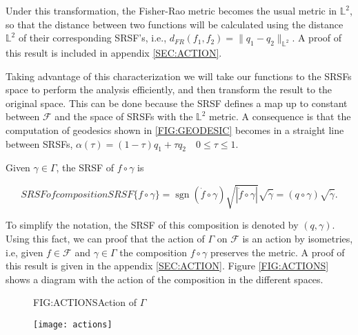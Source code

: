 Under this transformation, the Fisher-Rao metric becomes the usual metric
in $\mathbb{L}^2$, so that the distance between two functions will be
calculated using the distance $\mathbb{L}^2$ of their corresponding
SRSF's, i.e.,  $d_{FR}(f_1, f_2) = \| q_1 - q_2 \|_{\mathbb{L}^2}$. A proof of
this result is included in appendix \ref{SEC:ACTION}.

Taking advantage of this characterization we will take our functions to the
SRSFs space to perform the analysis efficiently, and then transform the result
to the original space. This can be done because the  \acs{SRSF} defines a map up to constant between
$\mathcal{F}$ and the space of SRSFs with the $\mathbb{L}^2$ metric.
A consequence is that the computation of geodesics shown in
\ref{FIG:GEODESIC} becomes in a straight line
between SRSFs,
$
\alpha(\tau) = (1 - \tau)q_1 + \tau q_2 \quad 0 \le \tau \le 1.
$

Given $\gamma \in \Gamma$, the SRSF of $f \circ \gamma$ is

\begin{equation}[]{SRSF of composition}
SRSF\{f \circ \gamma\} = \operatorname{sgn}(\dot{f} \circ \gamma) \sqrt{|\dot f \circ \gamma|}
\sqrt{\dot \gamma} = (q \circ \gamma) \sqrt{\dot \gamma}.
\end{equation}

To simplify the
notation, the  \acs{SRSF} of this composition is denoted by $(q, \gamma)$.
Using this fact, we can proof that the action of $\Gamma$ on $\mathcal{F}$ is an
action by isometries, i.e, given $f  \in \mathcal{F}$ and $\gamma \in \Gamma$
the composition $f \circ \gamma$ preserves the metric.
A proof of this result is given in the appendix \ref{SEC:ACTION}.
Figure \ref{FIG:ACTIONS} shows a diagram with the action of the composition
in the different spaces.

\begin{figure}[Action of $\Gamma$]{FIG:ACTIONS}{Action of $\Gamma$}

\texttt{[image: actions]}

\end{figure}
